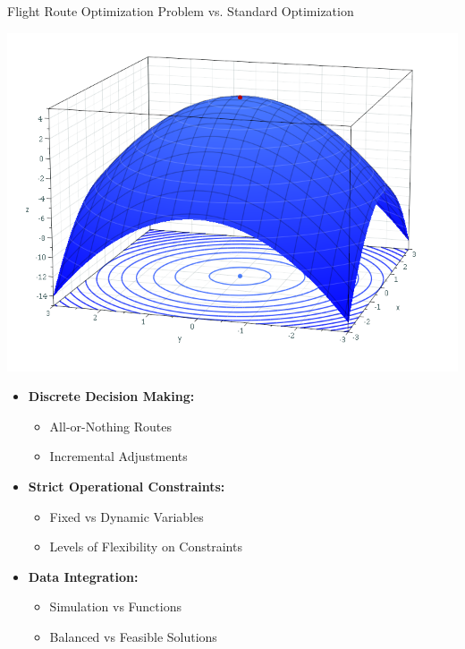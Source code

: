 \documentclass[aspectratio=169,xcolor=dvipsnames]{beamer}
\begin{document}
\begin{frame}{Flight Route Optimization Problem vs. Standard Optimization}
    \begin{minipage}{0.45\textwidth}
        \centering
        \includegraphics[width=\textwidth]{images/MaximumParaboloid.png}
    \end{minipage}
    \hfill
    \begin{minipage}{0.5\textwidth}
        \begin{itemize}
            \item \textbf{Discrete Decision Making:}
            \begin{itemize}
                \item All-or-Nothing Routes
                \item Incremental Adjustments
            \end{itemize}
            
            \item \textbf{Strict Operational Constraints:}
            \begin{itemize}
                \item Fixed vs Dynamic Variables
                \item Levels of Flexibility on Constraints
            \end{itemize}
            
            \item \textbf{Data Integration:}
            \begin{itemize}
                \item Simulation vs Functions
                \item Balanced vs Feasible Solutions
            \end{itemize}
        \end{itemize}
    \end{minipage}
\end{frame}
\end{document}
